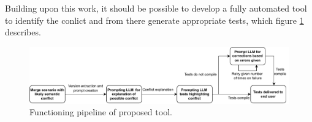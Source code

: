 Building upon this work, it should be possible to develop a fully automated tool to identify the conlict and from there generate appropriate tests,
which figure \ref{fig:tool} describes.
\begin{figure}
    \centering
    \includegraphics[width=1\linewidth]{figures/tool.pdf}
    \caption{Functioning pipeline of proposed tool.}
    \label{fig:tool}
\end{figure}